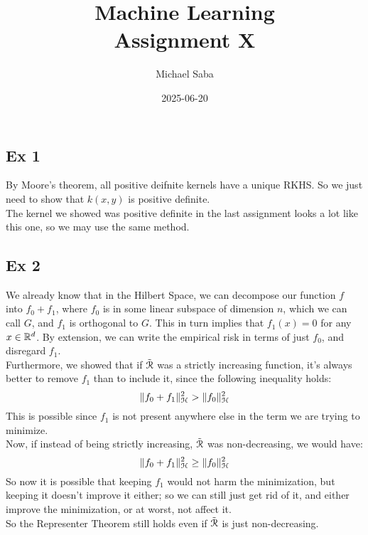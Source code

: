 \documentclass[12pt]{article}
\title{
    \Huge Machine Learning \\
    \Large Assignment X
}
\date{2025-06-20}
\author{Michael Saba}
\begin{document}
\maketitle
\newpage
\setlength{\parindent}{0pt}

\subsection*{Ex 1}
By Moore's theorem, all positive deifnite kernels
have a unique RKHS.
So we just need to show that $k(x, y)$ is positive
definite. \\
The kernel we showed was positive definite
in the last assignment looks a lot like this one,
so we may use the same method. \\

\newpage

\subsection*{Ex 2}

We already know that in the Hilbert Space, we can
decompose our function $f$ into $f_0 + f_1$, where
$f_0$ is in some linear subspace of dimension $n$,
which we can call $G$,
and $f_1$ is orthogonal to $G$.
This in turn implies that $f_1(x) = 0$
for any $x \in \mathbb{R}^d$. By extension,
we can write the empirical risk in terms of just
$f_0$, and disregard $f_1$. \\
Furthermore, we showed that if $\tilde{\mathcal{R}}$
was a strictly increasing function, it's always
better to remove $f_1$ than to include it,
since the following inequality holds:
\[ \|f_0+f_1\|^2_{\mathcal{H}} > \|f_0\|^2_{\mathcal{H}} \] 
This is possible since $f_1$ is not present
anywhere else in the term we are trying to minimize. \\
Now, if instead of being strictly increasing,
$\tilde{\mathcal{R}}$ was non-decreasing, we would have:
\[ \|f_0+f_1\|^2_{\mathcal{H}} \geq \|f_0\|^2_{\mathcal{H}} \]
So now it is possible that keeping $f_1$
would not harm the minimization, but keeping it
doesn't improve it either; so we can still just
get rid of it, and either improve the minimization,
or at worst, not affect it. \\
So the Representer Theorem still holds even
if $\tilde{\mathcal{R}}$ is just non-decreasing. \\

\end{document}
